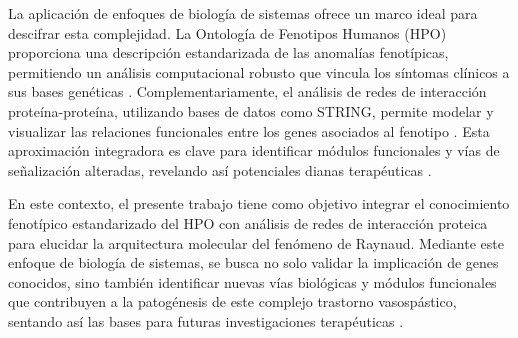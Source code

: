La aplicación de enfoques de biología de sistemas ofrece un marco ideal para descifrar esta complejidad. La Ontología de Fenotipos Humanos (HPO) proporciona una descripción estandarizada de las anomalías fenotípicas, permitiendo un análisis computacional robusto que vincula los síntomas clínicos a sus bases genéticas \cite{Khler2021, Robinson2008}. Complementariamente, el análisis de redes de interacción proteína-proteína, utilizando bases de datos como STRING, permite modelar y visualizar las relaciones funcionales entre los genes asociados al fenotipo \cite{Szklarczyk2025}. Esta aproximación integradora es clave para identificar módulos funcionales y vías de señalización alteradas, revelando así potenciales dianas terapéuticas \cite{Consortium}.

En este contexto, el presente trabajo tiene como objetivo integrar el conocimiento fenotípico estandarizado del HPO con análisis de redes de interacción proteica para elucidar la arquitectura molecular del fenómeno de Raynaud. Mediante este enfoque de biología de sistemas, se busca no solo validar la implicación de genes conocidos, sino también identificar nuevas vías biológicas y módulos funcionales que contribuyen a la patogénesis de este complejo trastorno vasospástico, sentando así las bases para futuras investigaciones terapéuticas \cite{Naylor2010, Fischer2025}.
